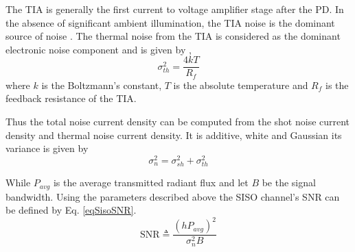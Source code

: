 The TIA is generally the first current to voltage amplifier stage after the PD. In the absence of significant ambient illumination, the TIA noise is the dominant source of noise \cite{kah97a}. The thermal noise from the TIA is considered as the dominant electronic noise component and is given by \cite{kah97a},
\begin{equation}
	\label{eqNpa}
	\sigma_{th}^{2} = \frac{4kT}{R_{f}}
\end{equation}
where $k$ is the Boltzmann's constant, $T$ is the absolute temperature and $R_{f}$ is the feedback resistance of the TIA.

Thus the total noise current density can be computed from the shot noise current density and thermal noise current density. It is additive, white and Gaussian its variance is given by 
\begin{equation}
	\label{eqNoise}
	\sigma_{n}^{2} = \sigma_{sh}^{2} + \sigma_{th}^{2}
\end{equation}

While $P_{avg}$ is the average transmitted radiant flux and let $B$ be the signal bandwidth. Using the parameters described above the SISO channel's SNR can be defined by Eq. \eqref{eqSisoSNR}.
\begin{equation}
	\label{eqSisoSNR}
	\text{SNR} \triangleq \frac{(hP_{avg})^{2}}{\sigma_{n}^{2}B}
\end{equation}

